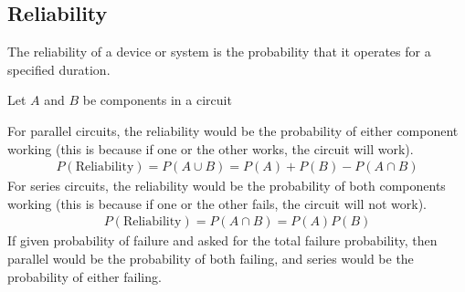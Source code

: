 \documentclass[12pt, titlepage, oneside]{article}
\begin{document}
        \subsection{Reliability}
        The reliability of a device or system is the probability that it operates for a specified duration.

        Let $A$ and $B$ be components in a circuit

        For parallel circuits, the reliability would be the probability of either component working (this is because if one or the other works, the circuit will work).
        \begin{align*}
          P(\text{Reliability}) = P(A \cup B) = P(A) + P(B) -P(A \cap B)
          \end{align*}
          For series circuits, the reliability would be the probability of both components working (this is because if one or the other fails, the circuit will not work).
          \begin{align*}
            P(\text{Reliability}) = P(A \cap B) = P(A) P(B)
          \end{align*}
          If given probability of failure and asked for the total failure probability, then parallel would be the probability of both failing, and series would be the probability of either failing.
\end{document}

